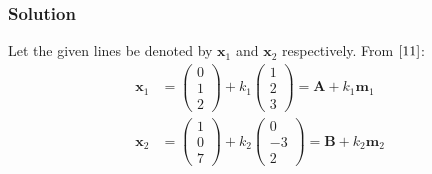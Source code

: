 \documentclass{beamer}
\begin{document}
\begin{frame}
\frametitle{Solution}
Let the given lines be denoted by $\textbf{x}_1$ and $\textbf{x}_2$ respectively. From $\eqref{11}$:
\begin{align}
    \textbf{x}_1 &= \begin{pmatrix}
        0\\
        1\\
        2
    \end{pmatrix} + k_1\begin{pmatrix}
        1\\
        2\\
        3
    \end{pmatrix} = \textbf{A} + k_1\textbf{m}_1 \label{12} \\
    \textbf{x}_2 &= \begin{pmatrix}
        1\\
        0\\
        7
    \end{pmatrix} + k_2\begin{pmatrix}
        0\\
        -3\\
        2
    \end{pmatrix} = \textbf{B} + k_2\textbf{m}_2 \label{13}
\end{align}
\end{frame}
\end{document}
